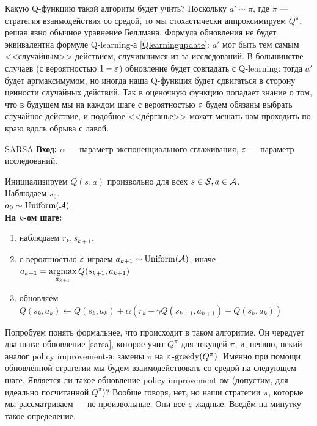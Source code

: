 Какую Q-функцию такой алгоритм будет учить? Поскольку $a' \sim \pi$, где $\pi$ --- стратегия взаимодействия со средой, то мы стохастически аппроксимируем $Q^{\pi}$, решая явно обычное уравнение Беллмана. Формула обновления не будет эквивалентна формуле Q-learning-а \eqref{Qlearningupdate}: $a'$ мог быть тем самым <<случайным>> действием, случившимся из-за исследований. В большинстве случаев (с вероятностью $1 \HM- \eps$) обновление будет совпадать с Q-learning: тогда $a'$ будет аргмаксимумом, но иногда наша Q-функция будет сдвигаться в сторону ценности случайных действий. Так в оценочную функцию попадает знание о том, что в будущем мы на каждом шаге с вероятностью $\varepsilon$ будем обязаны выбрать случайное действие, и подобное <<дёрганье>> может мешать нам проходить по краю вдоль обрыва с лавой.

\begin{algorithm}{SARSA}
\textbf{Вход:} $\alpha$ --- параметр экспоненциального сглаживания, $\varepsilon$ --- параметр исследований.

\vspace{0.3cm}
Инициализируем $Q(s, a)$ произвольно для всех $s \in \mathcal{S}, a \in \mathcal{A}$. \\
Наблюдаем $s_0$. \\ 
$a_0 \sim \operatorname{Uniform}(\mathcal{A})$. \\
\textbf{На $k$-ом шаге:}
\begin{enumerate}
    \item наблюдаем $r_k, s_{k+1}$.
    \item с вероятностью $\varepsilon$ играем $a_{k+1} \sim \operatorname{Uniform}(\mathcal{A})$, иначе $a_{k+1} = \mathop{\mathrm{argmax}}\limits_{a_{k+1}} Q(s_{k+1}, a_{k+1})$
    \item обновляем $Q(s_k, a_k) \leftarrow Q(s_k, a_k) + \alpha \left( r_k + \gamma Q(s_{k+1}, a_{k+1}) - Q(s_k, a_k) \right)$
\end{enumerate}
\end{algorithm}

Попробуем понять формальнее, что происходит в таком алгоритме. Он чередует два шага: обновление \eqref{sarsa}, которое учит $Q^{\pi}$ для текущей $\pi$, и, неявно, некий аналог policy improvement-а: замены $\pi$ на $\varepsilon\operatorname{-greedy}(Q^{\pi})$. Именно при помощи обновлённой стратегии мы будем взаимодействовать со средой на следующем шаге. Является ли такое обновление policy improvement-ом (допустим, для идеально посчитанной $Q^\pi$)? Вообще говоря, нет, но наши стратегии $\pi$, которые мы рассматриваем --- не произвольные. Они все $\varepsilon$-жадные. Введём на минутку такое определение.

